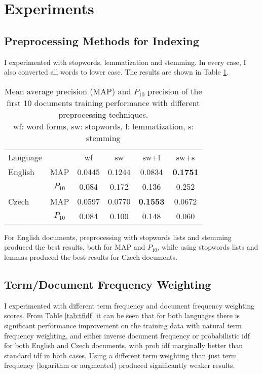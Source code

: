 \documentclass[a4paper]{article}
\begin{document}
\section{Experiments}

\subsection{Preprocessing Methods for Indexing}
\label{sec:preproc}
I experimented with stopwords, lemmatization and stemming. In every case, I also
converted all words to lower case. The results are shown in Table
\ref{tab:terms}. 

\begin{table}[htpb]
	\centering
	\caption{Mean average precision (MAP) and $P_{10}$ precision of the first 10
		documents training performance with different preprocessing techniques.\\
	wf: word forms, sw: stopwords, l: lemmatization, s: stemming\\}
	\label{tab:terms}
	\begin{tabular}{@{}l|ccccc@{}}
		\toprule
		Language & & wf & sw & sw+l & sw+s \\
		\cmidrule(r){1-1}\cmidrule(lr){2-2}\cmidrule(lr){3-3}\cmidrule(lr){4-4}\cmidrule(lr){5-5}\cmidrule(l){6-6}
		English & MAP & 0.0445 & 0.1244 & 0.0834 & \textbf{0.1751} \\
				& \small{$P_{10}$} & \small{0.084} & \small{0.172} & \small{0.136} & \small{0.252} \\
		\cmidrule(r){1-1}\cmidrule(lr){2-2}\cmidrule(lr){3-3}\cmidrule(lr){4-4}\cmidrule(lr){5-5}\cmidrule(l){6-6}
		Czech & MAP & 0.0597 & 0.0770 & \textbf{0.1553} & 0.0672 \\
			  & \small{$P_{10}$} & \small{0.084} & \small{0.100} & \small{0.148} & \small{0.060} \\
		\bottomrule
	\end{tabular}
\end{table}

For English documents, preprocessing with stopwords lists and stemming produced
the best results, both for MAP and $P_{10}$, while using stopwords lists and
lemmas produced the best results for Czech documents.

\subsection{Term/Document Frequency Weighting}
I experimented with different term frequency and document frequency weighting
scores. From Table \ref{tab:tfidf} it can be seen that for both languages there
is significant performance improvement on the training data with natural term
frequency weighting, and either inverse document frequency or probabilistic idf
for both English and Czech documents, with prob idf marginally better than 
standard idf in both cases. Using a different term weighting than just term
frequency (logarithm or augmented) produced significantly weaker results.
\end{document}
